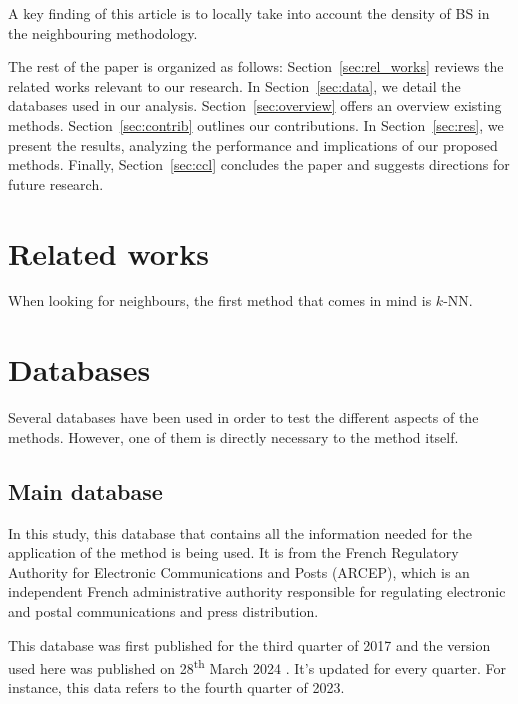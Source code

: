 \documentclass[lettersize,journal,english]{IEEEtran}
\begin{document}
    A key finding of this article is to locally take into account the density of BS in the neighbouring methodology.

    The rest of the paper is organized as follows: Section~\ref{sec:rel_works} reviews the related works relevant to our research. In Section~\ref{sec:data}, we detail the databases used in our analysis. Section~\ref{sec:overview} offers an overview existing methods. Section~\ref{sec:contrib} outlines our contributions. In Section~\ref{sec:res}, we present the results, analyzing the performance and implications of our proposed methods. Finally, Section~\ref{sec:ccl} concludes the paper and suggests directions for future research.

\section{Related works\label{sec:rel_works}}
    \noindent When looking for neighbours, the first method that comes in mind is $k$-NN.

\section{Databases\label{sec:data}}
    \noindent Several databases have been used in order to test the different aspects of the methods. However, one of them is directly necessary to the method itself.

    \subsection{Main database}
        In this study, this database \cite{main_database} that contains all the information needed for the application of the method is being used. It is from the French Regulatory Authority for Electronic Communications and Posts (ARCEP), which is an independent French administrative authority responsible for regulating electronic and postal communications and press distribution.

        This database was first published for the third quarter of 2017 and the version used here was published on 28\textsuperscript{th} March 2024 \cite{main_database_hist}.
        It's updated for every quarter. For instance, this data refers to the fourth quarter of 2023.
\end{document}
